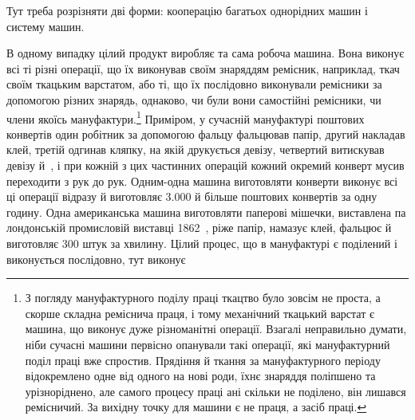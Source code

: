 Тут треба розрізняти дві форми: кооперацію багатьох однорідних
машин і систему машин.

В одному випадку цілий продукт виробляє та сама робоча
машина. Вона виконує всі ті різні операції, що їх виконував своїм
знаряддям ремісник, наприклад, ткач своїм ткацьким варстатом,
або ті, що їх послідовно виконували ремісники за допомогою
різних знарядь, однаково, чи були вони самостійні ремісники,
чи члени якоїсь мануфактури.\footnote{
З погляду мануфактурного поділу праці ткацтво було зовсім не
проста, а скорше складна реміснича праця, і тому механічний ткацький
варстат є машина, що виконує дуже різноманітні операції. Взагалі неправильно
думати, ніби сучасні машини первісно опанували такі операції,
які мануфактурний поділ праці вже спростив. Прядіння й ткання за мануфактурного
періоду відокремлено одне від одного на нові роди, їхнє знаряддя
поліпшено та урізноріднено, але самого процесу праці ані скільки
не поділено, він лишався ремісничий. За вихідну точку для машини є не
праця, а засіб праці.
} Приміром, у сучасній мануфактурі
поштових конвертів один робітник за допомогою фальцу
фальцював папір, другий накладав клей, третій одгинав кляпку,
на якій друкується девізу, четвертий витискував девізу й~,
і при кожній з цих частинних операцій кожний окремий конверт
мусив переходити з рук до рук. Одним-одна машина виготовляти
конверти виконує всі ці операції відразу й виготовляє \num{3.000} й
більше поштових конвертів за одну годину. Одна американська
машина виготовляти паперові мішечки, виставлена па лондонській
промисловій виставці 1862~, ріже папір, намазує клей,
фальцює й виготовляє 300 штук за хвилину. Цілий процес, що в
мануфактурі є поділений і виконується послідовно, тут виконує
\parbreak{}  %
